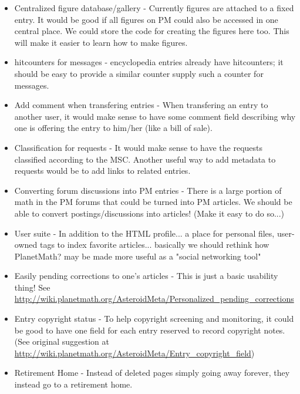 \begin{itemize}
\item Centralized figure database/gallery - Currently figures are attached to a fixed entry. It would be good if all figures on PM could also be accessed in one central place. We could store the code for creating the figures here too. This will make it easier to learn how to make figures. 

\item hitcounters for messages - encyclopedia entries already have hitcounters; it should be easy to provide a similar counter supply such a counter for messages. 

\item Add comment when transfering entries - When transfering an entry to another user, it would make sense to have some comment field describing why one is offering the entry to him/her (like a bill of sale). 

\item Classification for requests - It would make sense to have the requests classified according to the MSC. Another useful way to add metadata to requests would be to add links to related entries. 

\item Converting forum discussions into PM entries - There is a large portion of math in the PM forums that could be turned into PM articles. We should be able to convert postings/discussions into articles! (Make it easy to do so...) 

\item User suite - In addition to the HTML profile... a place for personal files, user-owned tags to index favorite articles... basically we should rethink how PlanetMath? may be made more useful as a "social networking tool" 

\item Easily pending corrections to one's articles - This is just a basic usability thing! See \url{http://wiki.planetmath.org/AsteroidMeta/Personalized_pending_corrections} 

\item Entry copyright status - To help copyright screening and monitoring, it could be good to have one field for each entry reserved to record copyright notes. (See original suggestion at \url{http://wiki.planetmath.org/AsteroidMeta/Entry_copyright_field}) 

\item Retirement Home - Instead of deleted pages simply going away forever, they instead go to a retirement home. 


\end{itemize}
